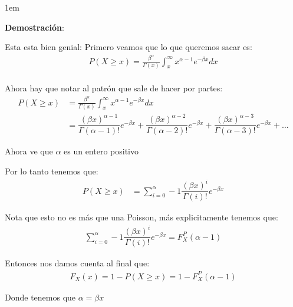 \documentclass[12pt, fleqn]{report}                             %
\newenvironment{SmallIndentation}[1][0.75em]                    %
        {\begin{adjustwidth}{#1}{}\begin{footnotesize}}             %
        {\end{footnotesize}\end{adjustwidth}}                       %
\theoremstyle{break}                                            %
\begin{document}
                \begin{SmallIndentation}[1em]
                    \textbf{Demostración}:
                    
                    Esta esta bien genial:
                    Primero veamos que lo que queremos sacar es:
                    \begin{align*}
                        P(X \geq x) = \frac{\beta^\alpha}{\Gamma(x)} 
                                            \int_x^\infty x^{\alpha-1} e^{-\beta x} dx     \\
                    \end{align*}

                    Ahora hay que notar al patrón que sale de hacer por partes:
                    \begin{align*}
                         P(X \geq x) 
                            &= \frac{\beta^\alpha}{\Gamma(x)} 
                                            \int_x^\infty x^{\alpha-1} e^{-\beta x} dx     \\
                            &= 
                                \dfrac{(\beta x)^{\alpha -1}}{\Gamma(\alpha - 1)!}e^{-\beta x}
                                +
                                \dfrac{(\beta x)^{\alpha -2}}{\Gamma(\alpha - 2)!}e^{-\beta x}
                                +
                                \dfrac{(\beta x)^{\alpha -3}}{\Gamma(\alpha - 3)!}e^{-\beta x}
                                + \dots
                    \end{align*}

                    Ahora ve que $\alpha$ es un entero positivo 

                    Por lo tanto tenemos que:
                    \begin{align*}
                        P(X \geq x) 
                            &= \sum_{i = 0}^\alpha - 1 \dfrac{(\beta x)^i}{\Gamma(i)!}e^{-\beta x}
                    \end{align*}

                    Nota que esto no es más que una Poisson, más explicitamente tenemos que:
                    \begin{align*}
                        \sum_{i = 0}^\alpha - 1 \dfrac{(\beta x)^i}{\Gamma(i)!}e^{-\beta x}
                            = F_{X}^P (\alpha - 1)
                    \end{align*}

                    Entonces nos damos cuenta al final que:
                    \begin{align*}
                        F_X(x) = 1 - P(X \geq x) = 1 - F_{X}^P (\alpha - 1)
                    \end{align*}
                    
                    Donde tenemos que $\alpha = \beta x$

                
                \end{SmallIndentation}
                
\end{document}

